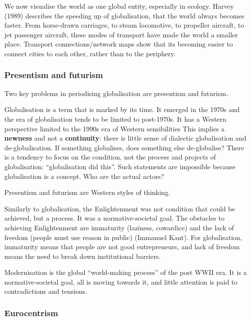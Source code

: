 \documentclass{article}
\begin{document}
We now visualise the world as one global entity, especially in ecology. Harvey (1989) describes the speeding up of globalisation, that the world always becomes faster. From horse-drawn carriages, to steam locomotive, to propeller aircraft, to jet passenger aircraft, these modes of transport have made the world a smaller place. Transport connections/network maps show that its becoming easier to connect cities to each other, rather than to the periphery. 

\subsubsection{Presentism and futurism}

Two key problems in periodising globalisation are presentism and futurism.

\begin{outline}
	\1 Globalisation is a term that is marked by its time. It emerged in the 1970s and the era of globalisation tends to be limited to post-1970s. It has a Western perspective limited to the 1990s era of Western sensibilities
	\1 This implies a \textbf{newness} and not a \textbf{continuity}: there is little sense of dialectic globalisation and de-globalisation. If something globalises, does something else de-globalise?
	\1 There is a tendency to focus on the condition, not the process and projects of globalisation: ``globalisation did this''. Such statements are impossible because globalisation is a concept. Who are the actual actors?
\end{outline}

Presentism and futurism are Western styles of thinking. 

Similarly to globalisation, the Enlightenment was not condition that could be achieved, but a process. It was a normative-societal goal. The obstacles to achieving Enlightenment are immaturity (laziness, cowardice) and the lack of freedom (people must use reason in public) (Immanuel Kant). For globalisation, immaturity means that people are not good entrepreneurs, and lack of freedom means the need to break down institutional barriers. 

Modernisation is the global ``world-making process'' of the post WWII era. It is a normative-societal goal, all is moving towards it, and little attention is paid to contradictions and tensions. 

\subsubsection{Eurocentrism}
\end{document}
